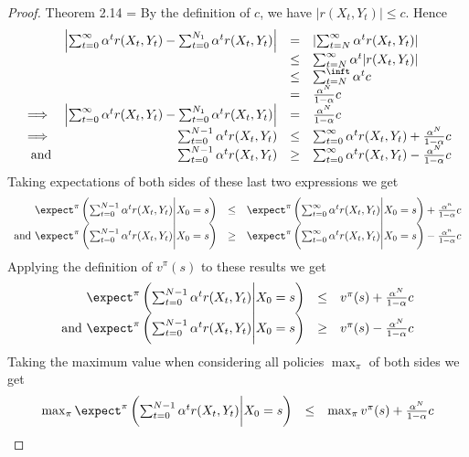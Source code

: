 \documentclass[11pt,a4paper]{article}
\begin{document}
  \begin{proof}{Theorem 2.14}
    \everymath={\displaystyle}
    By the definition of $c$, we have $|r(X_t,Y_t)|\leq c$. Hence
    \[\begin{array}{rrcl}
      &\left|\sum_{t=0}^\infty\alpha^tr(X_t,Y_t)-\sum_{t=0}^{N_1}\alpha^tr(X_t,Y_t)\right|&=&\left|\sum_{t=N}^\infty\alpha^tr(X_t,Y_t)\right|\\
      &&\leq&\sum_{t=N}^\infty\alpha^t|r(X_t,Y_t)|\\
      &&\leq&\sum_{t=N}^\inft\alpha^t c\\
      &&=&\frac{\alpha^N}{1-\alpha}c\\
      \implies&\left|\sum_{t=0}^\infty\alpha^tr(X_t,Y_t)-\sum_{t=0}^{N_1}\alpha^tr(X_t,Y_t)\right|&=&\frac{\alpha^N}{1-\alpha}c\\
      \implies&\sum_{t=0}^{N-1}\alpha^tr(X_t,Y_t)&\leq&\sum_{t=0}^\infty\alpha^tr(X_t,Y_t)+\frac{\alpha^N}{1-\alpha}c\\
      \text{and}&\sum_{t=0}^{N-1}\alpha^tr(X_t,Y_t)&\geq&\sum_{t=0}^\infty\alpha^tr(X_t,Y_t)-\frac{\alpha^N}{1-\alpha}c\\
    \end{array}\]
    Taking expectations of both sides of these last two expressions we get
    \[\begin{array}{rcl}
      \expect^\pi\left(\sum_{t=0}^{N-1}\alpha^tr(X_t,Y_t)\bigg|X_0=s\right)&\leq&\expect^\pi\left(\sum_{t=0}^\infty\alpha^tr(X_t,Y_t)\bigg|X_0=s\right)+\frac{\alpha^n}{1-\alpha}c\\
      \text{and }\expect^\pi\left(\sum_{t=0}^{N-1}\alpha^tr(X_t,Y_t)\bigg|X_0=s\right)&\geq&\expect^\pi\left(\sum_{t=0}^\infty\alpha^tr(X_t,Y_t)\bigg|X_0=s\right)-\frac{\alpha^n}{1-\alpha}c
    \end{array}\]
    Applying the definition of $v^\pi(s)$ to these results we get
    \[\begin{array}{rcl}
      \expect^\pi\left(\sum_{t=0}^{N-1}\alpha^tr(X_t,Y_t)\bigg|X_0=s\right)&\leq&v^\pi(s)+\frac{\alpha^N}{1-\alpha}c\\
      \text{and }\expect^\pi\left(\sum_{t=0}^{N-1}\alpha^tr(X_t,Y_t)\bigg|X_0=s\right)&\geq&v^\pi(s)-\frac{\alpha^N}{1-\alpha}c\\
    \end{array}\]
    Taking the maximum value when considering all policies $\max_\pi$ of both sides we get
    \[\begin{array}{rcl}
      \max_\pi\expect^\pi\left(\sum_{t=0}^{N-1}\alpha^tr(X_t,Y_t)\bigg|X_0=s\right)&\leq&\max_\pi v^\pi(s)+\frac{\alpha^N}{1-\alpha}c\\

\end{array}\]
\end{proof}
\end{document}
